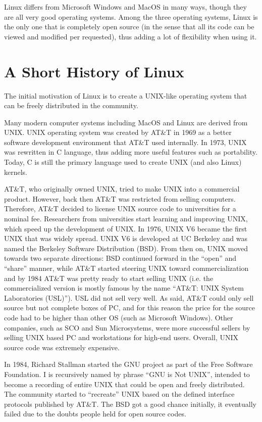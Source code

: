 Linux differs from Microsoft Windows and MacOS in many ways, though they are all very good operating systems. Among the three operating systems, Linux is the only one that is completely open source (in the sense that all its code can be viewed and modified per requested), thus adding a lot of flexibility when using it.

\section{A Short History of Linux}

The initial motivation of Linux is to create a UNIX-like operating system that can be freely distributed in the community.

Many modern computer systems including MacOS and Linux are derived from UNIX. UNIX operating system was created by AT\&T in 1969 as a better software development environment that AT\&T used internally. In 1973, UNIX was rewritten in C language, thus adding more useful features such as portability. Today, C is still the primary language used to create UNIX (and also Linux) kernels.

AT\&T, who originally owned UNIX, tried to make UNIX into a commercial product. However, back then AT\&T was restricted from selling computers. Therefore, AT\&T decided to license UNIX source code to universities for a nominal fee. Researchers from universities start learning and improving UNIX, which speed up the development of UNIX. In 1976, UNIX V6 became the first UNIX that was widely spread. UNIX V6 is developed at UC Berkeley and was named the Berkeley Software Distribution (BSD). From then on, UNIX moved towards two separate directions: BSD continued forward in the ``open'' and ``share'' manner, while AT\&T started steering UNIX toward commercialization and by 1984 AT\&T was pretty ready to start selling UNIX (i.e. the commercialized version is mostly famous by the name ``AT\&T: UNIX System Laboratories (USL)''). USL did not sell very well. As said, AT\&T could only sell source but not complete boxes of PC, and for this reason the price for the source code had to be higher than other OS (such as Microsoft Windows). Other companies, such as SCO and Sun Microsystems, were more successful sellers by selling UNIX based PC and workstations for high-end users. Overall, UNIX source code was extremely expensive.

In 1984, Richard Stallman started the GNU project as part of the Free Software Foundation. I is recursively named by phrase ``GNU is Not UNIX'', intended to become a recording of entire UNIX that could be open and freely distributed. The community started to ``recreate'' UNIX based on the defined interface protocols published by AT\&T. The BSD got a good chance initially, it eventually failed due to the doubts people held for open source codes.

